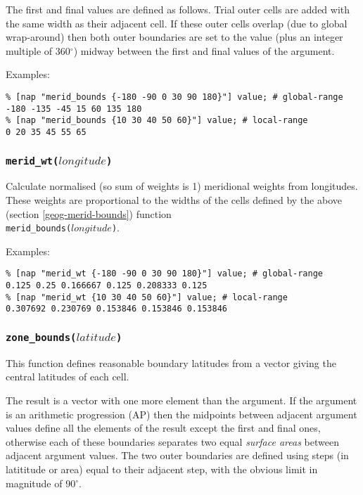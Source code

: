  The first and final values are defined as follows. Trial outer
  cells are added with the same width as their adjacent cell. If these
  outer cells overlap (due to global wrap-around) then both outer
  boundaries are set to the value (plus an integer multiple of 360$^{\circ}$)
  midway between the first and final values of the argument.
  
 Examples:
  \begin{verbatim}
% [nap "merid_bounds {-180 -90 0 30 90 180}"] value; # global-range
-180 -135 -45 15 60 135 180
% [nap "merid_bounds {10 30 40 50 60}"] value; # local-range
0 20 35 45 55 65
\end{verbatim}

\subsubsection{\texttt{merid\_wt(}$longitude$\texttt{)}}
    \label{geog-merid-wt}

Calculate normalised (so sum of weights is 1) meridional weights
  from longitudes. These weights are proportional to the widths of the
  cells defined by the above 
(section \ref{geog-merid-bounds})
function 
\\
\texttt{merid\_bounds(}$longitude$\texttt{)}.
  
 Examples:
  \begin{verbatim}
% [nap "merid_wt {-180 -90 0 30 90 180}"] value; # global-range
0.125 0.25 0.166667 0.125 0.208333 0.125
% [nap "merid_wt {10 30 40 50 60}"] value; # local-range
0.307692 0.230769 0.153846 0.153846 0.153846
\end{verbatim}

\subsubsection{\texttt{zone\_bounds(}$latitude$\texttt{)}}
    \label{geog-zone-bounds}

This function defines reasonable boundary latitudes from a
  vector giving the central latitudes of each cell.
  
 The result is a vector with one more element than the argument. If
  the argument is an arithmetic progression (AP) then the midpoints
  between adjacent argument values define all the elements of the
  result except the first and final ones, otherwise each of these
  boundaries separates two equal 
  \textit{surface areas} between adjacent argument values. The two
  outer boundaries are defined using steps (in latititude or area)
  equal to their adjacent step, with the obvious limit in magnitude of
  90$^{\circ}$.
  
